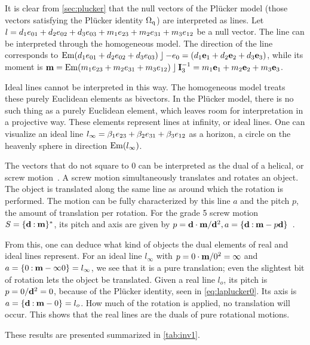 It is clear from \autoref{sec:plucker} that the null vectors of the Pl\"ucker model (those vectors satisfying the Pl\"ucker identity $\operatorname{\Omega_q}$) are interpreted as lines.  Let $l = d_1 e_{01} + d_2 e_{02} + d_3 e_{03} + m_1 e_{23} + m_2 e_{31} + m_3 e_{12}$ be a null vector.  The line can be interpreted through the homogeneous model.  The direction of the line corresponds to $\operatorname{Em}(d_1 e_{01} + d_2 e_{02} + d_3 e_{03}) \mathbin{\rfloor} -e_0 = (d_1 \mathbf{e}_1 + d_2 \mathbf{e}_2 + d_3 \mathbf{e}_3)$, while its moment is $\mathbf{m} = \operatorname{Em}(m_1 e_{23} + m_2 e_{31} + m_3 e_{12}) \mathbin{\rfloor} \mathbf{I}_3^{-1} = m_1 \mathbf{e}_1 + m_2 \mathbf{e}_2 + m_3 \mathbf{e}_3$.

Ideal lines cannot be interpreted in this way.  The homogeneous model treats these purely Euclidean elements as bivectors.  In the Pl\"ucker model, there is no such thing as a purely Euclidean element, which leaves room for interpretation in a projective way.  These elements represent lines at infinity, or ideal lines.  One can visualize an ideal line $l_\infty = \beta_1 e_{23} + \beta_2 e_{31} + \beta_3 e_{12}$ as a horizon, a circle on the heavenly sphere in direction $\operatorname{Em}(l_\infty)$.  

The vectors that do not square to $0$ can be interpreted as the dual of a helical, or screw motion~\cite[Section 3.1.2]{Pottmann}.  A screw motion simultaneously translates and rotates an object.  The object is translated along the same line as around which the rotation is performed.  The motion can be fully characterized by this line $a$ and the pitch $p$, the amount of translation per rotation.  For the grade 5 screw motion $S = \{\mathbf{d} \mathbin{:} \mathbf{m}\}^\ast$, its pitch and axis are given by $p = \mathbf{d} \mathbin{\cdot} \mathbf{m} / \mathbf{d}^2, a = \{\mathbf{d} \mathbin{:} \mathbf{m} - p \mathbf{d}\}$~\cite[Theorem 3.1.9]{Pottmann}.  

From this, one can deduce what kind of objects the dual elements of real and ideal lines represent.  For an ideal line $l_\infty$ with $p = 0 \mathbin{\cdot} \mathbf{m} / 0^2 = \infty$ and $a = \{0 \mathbin{:} \mathbf{m} - \infty 0\} = l_\infty$, we see that it is a pure translation; even the slightest bit of rotation lets the object be translated.  Given a real line $l_o$, its pitch is $p = 0 / \mathbf{d}^2 = 0$, because of the Pl\"ucker identity, seen in \autoref{eq:laplucker0}.  Its axis is $a = \{\mathbf{d} \mathbin{:} \mathbf{m} - 0\} = l_o$.  How much of the rotation is applied, no translation will occur.  This shows that the real lines are the duals of pure rotational motions.

These results are presented summarized in \autoref{tab:inv1}. 


